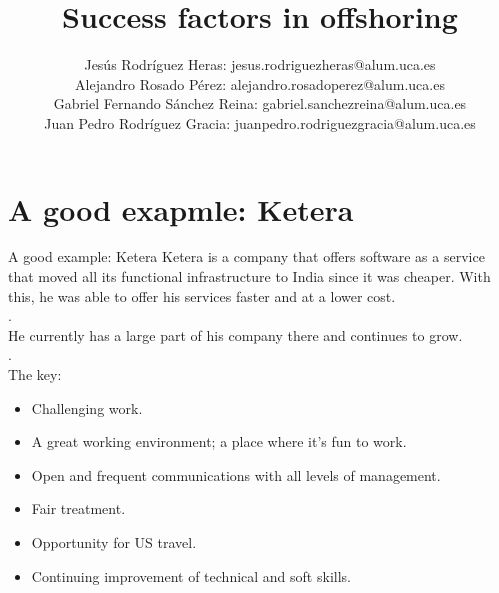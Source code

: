 \documentclass{beamer}
\title{Success factors in offshoring}
\author{Jesús Rodríguez Heras: jesus.rodriguezheras@alum.uca.es \\ Alejandro Rosado Pérez: alejandro.rosadoperez@alum.uca.es \\  Gabriel Fernando Sánchez Reina: gabriel.sanchezreina@alum.uca.es \\ Juan Pedro Rodríguez Gracia: juanpedro.rodriguezgracia@alum.uca.es}
\begin{document}
\begin{frame}
  \titlepage
  
\end{frame}



\section{A good exapmle: Ketera}
\begin{frame}{A good example: Ketera}
	Ketera is a company that offers software as a service that moved all its functional infrastructure to India since it was cheaper. With this, he was able to offer his services faster and at a lower cost.\\
	\color{white}.\\
	\color{black}
	He currently has a large part of his company there and continues to grow.\\
	\color{white}.\\
	\color{black}
	The key:
	\begin{itemize}
		\item Challenging work.
		\item A great working environment; a place where it’s fun to work.
		\item Open and frequent communications with all levels of management.
		\item Fair treatment.
		\item Opportunity for US travel.
		\item Continuing improvement of technical and soft skills.
	\end{itemize}
\end{frame}
\end{document}

